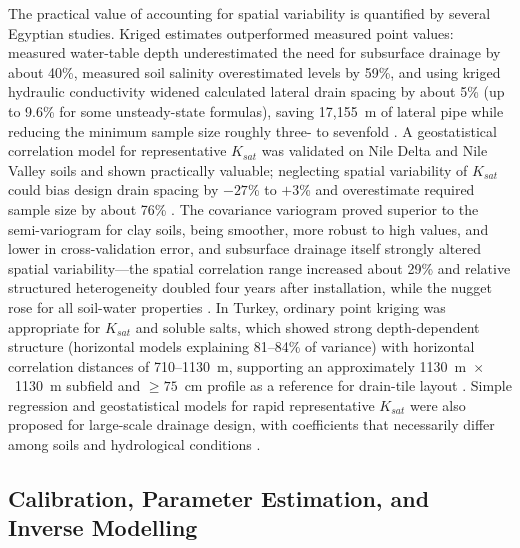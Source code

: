 The practical value of accounting for spatial variability is quantified by
several Egyptian studies. Kriged estimates outperformed measured point values:
measured water-table depth underestimated the need for subsurface drainage by
about 40\%, measured soil salinity overestimated levels by 59\%, and using
kriged hydraulic conductivity widened calculated lateral drain spacing by about
5\% (up to 9.6\% for some unsteady-state formulas), saving 17{,}155~m of lateral
pipe while reducing the minimum sample size roughly three- to sevenfold
\parencite{Moustafa1998b}. A geostatistical correlation model for representative
$K_{sat}$ was validated on Nile Delta and Nile Valley soils and shown practically
valuable; neglecting spatial variability of $K_{sat}$ could bias design drain
spacing by $-27$\% to $+3$\% and overestimate required sample size by about 76\%
\parencite{Moustafa2000}. The covariance variogram proved superior to the
semi-variogram for clay soils, being smoother, more robust to high values, and
lower in cross-validation error, and subsurface drainage itself strongly altered
spatial variability---the spatial correlation range increased about 29\% and
relative structured heterogeneity doubled four years after installation, while
the nugget rose for all soil-water properties \parencite{Moustafa1998}. In
Turkey, ordinary point kriging was appropriate for $K_{sat}$ and soluble salts,
which showed strong depth-dependent structure (horizontal models explaining
81--84\% of variance) with horizontal correlation distances of 710--1130~m,
supporting an approximately 1130~m~$\times$~1130~m subfield and $\geq75$~cm profile
as a reference for drain-tile layout \parencite{Akis2015}. Simple regression and
geostatistical models for rapid representative $K_{sat}$ were also proposed for
large-scale drainage design, with coefficients that necessarily differ among
soils and hydrological conditions \parencite{Sepaskhah2004}.

\subsection{Calibration, Parameter Estimation, and Inverse Modelling}

